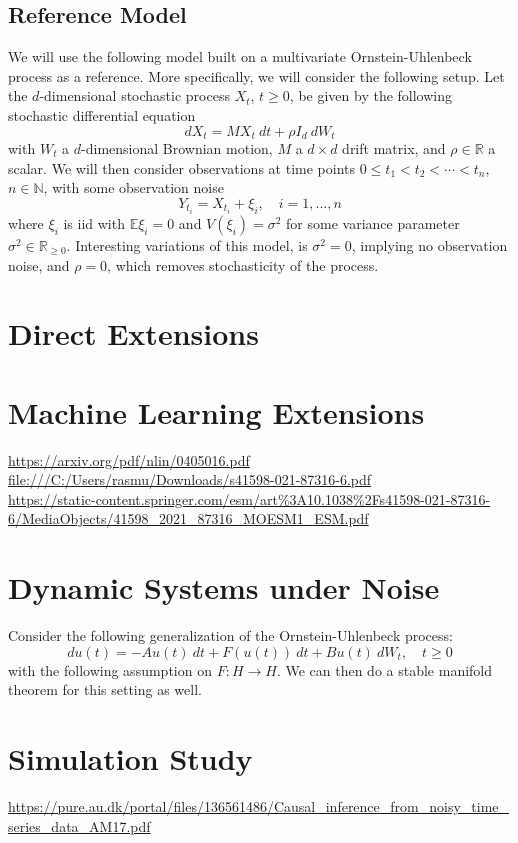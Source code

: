 \documentclass[11pt, a4paper]{memoir}
\theoremstyle{break}
\theoremstyle{break}
\theoremstyle{nonumberplain}
\begin{document}
\subsection*{Reference Model}
We will use the following model built on a multivariate Ornstein-Uhlenbeck process as a reference. More specifically, we will consider the following setup. Let the $d$-dimensional stochastic process $X_t$, $t\geqslant 0$, be given by the following stochastic differential equation
$$dX_t=M X_t\ dt+\rho I_d\ dW_t$$
with $W_t$ a $d$-dimensional  Brownian motion, $M$ a $d\times d$ drift matrix, and $\rho\in \mathbb{R}$ a scalar. We will then consider observations at time points $0\leqslant t_1<t_2<\cdots <t_n$, $n\in \mathbb{N}$, with some observation noise
$$Y_{t_i}=X_{t_i}+\xi_i,\quad i=1,...,n$$
where $\xi_i$ is iid with $\mathbb{E} \xi_i=0$ and $V(\xi_i)=\sigma^2$ for some variance parameter $\sigma^2\in \mathbb{R}_{\geqslant 0}$. Interesting variations of this model, is $\sigma^2=0$, implying no observation noise, and $\rho=0$, which removes stochasticity of the process.
\section{Direct Extensions}


\section{Machine Learning Extensions}
\url{https://arxiv.org/pdf/nlin/0405016.pdf}\\[5pt]
\url{file:///C:/Users/rasmu/Downloads/s41598-021-87316-6.pdf}\\[5pt]
\url{https://static-content.springer.com/esm/art%3A10.1038%2Fs41598-021-87316-6/MediaObjects/41598_2021_87316_MOESM1_ESM.pdf}

\section{Dynamic Systems under Noise}
Consider the following generalization of the Ornstein-Uhlenbeck process:
$$du(t)=-Au(t)\ dt+F(u(t))\ dt+B u(t)\ dW_t,\quad t\geqslant 0$$
with the following assumption on $F:H\to H$. We can then do a stable manifold theorem for this setting as well.
\cite{StableManifoldStoc} 

\section{Simulation Study}
\url{https://pure.au.dk/portal/files/136561486/Causal_inference_from_noisy_time_series_data_AM17.pdf}






\end{document}
